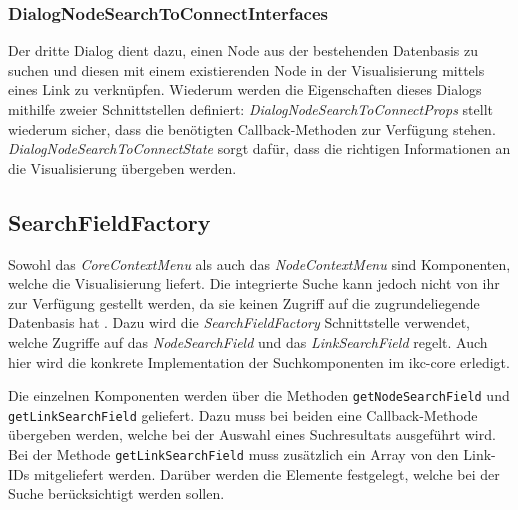 \subsubsection{DialogNodeSearchToConnectInterfaces}
\label{DialogNodeSearchToConnectInterfaces}

Der dritte Dialog dient dazu, einen \gls{Node} aus der bestehenden Datenbasis zu suchen und diesen mit einem existierenden \gls{Node} in der Visualisierung mittels eines \gls{Link} zu verknüpfen. Wiederum werden die Eigenschaften dieses Dialogs mithilfe zweier Schnittstellen definiert: \textit{Dialog\-Node\-Search\-To\-Con\-nect\-Props} stellt wiederum sicher, dass die benötigten \gls{Callback}-Methoden zur Verfügung stehen. \textit{Dialog\-Node\-Search\-To\-Con\-nect\-State} sorgt dafür, dass die richtigen Informationen an die Visualisierung übergeben werden.



\subsection{SearchFieldFactory}
\label{SearchFieldFactory}
Sowohl das \textit{CoreContextMenu} als auch das \textit{NodeContextMenu} sind Komponenten, welche die Visualisierung liefert. Die integrierte Suche kann jedoch nicht von ihr zur Verfügung gestellt werden, da sie keinen Zugriff auf die zugrundeliegende Datenbasis hat%
. Dazu wird die \textit{SearchFieldFactory} Schnittstelle verwendet, welche Zugriffe auf das \textit{NodeSearchField} und das \textit{LinkSearchField} regelt. Auch hier wird die konkrete Implementation der Suchkomponenten im \gls{ikc-core} erledigt.

Die einzelnen Komponenten werden über die Methoden \texttt{get\-Node\-Search\-Field} und \texttt{getLinkSearchField} geliefert. Dazu muss bei beiden eine \gls{Callback}-Methode übergeben werden, welche bei der Auswahl eines Suchresultats ausgeführt wird. Bei der Methode \texttt{get\-Link\-Search\-Field} muss zusätzlich ein \gls{Array} von den Link-IDs mitgeliefert werden. Darüber werden die Elemente festgelegt, welche bei der Suche berücksichtigt werden sollen.

